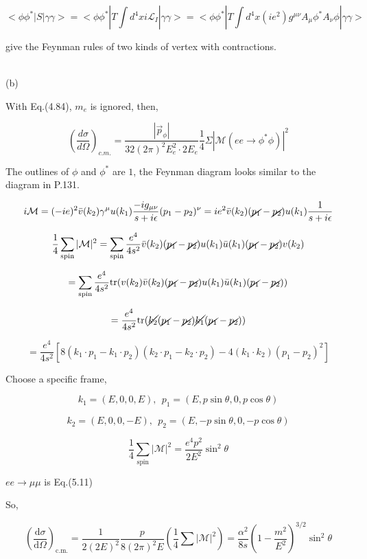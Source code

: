 \documentclass[prd,aps,nofootinbib,floatfix,10pt]{revtex4}
\newcommand{\blue}[1]{{\color{blue} #1}}
\begin{document}
\[ <\phi \phi^* | S | \gamma \gamma> = <\phi \phi^* | T \int d^4 x i \mathcal{L}_I | \gamma \gamma> = <\phi \phi^* | T \int d^4 x (i e^2) g^{\mu \nu} A_{\mu} \phi^* A_{\nu} \phi | \gamma \gamma> \]

give the Feynman rules of two kinds of vertex with contractions.


~\\
\noindent (b)

With \blue{Eq.(4.84)}, $m_e$ is ignored, then,

\[(\frac{d \sigma}{d \Omega})_{c.m.} = \frac{|\vec{p}_{\phi}|}{32 (2\pi)^2 E_{e}^2 \cdot 2 E_e } \frac{1}{4} \Sigma |\mathcal{M}(ee \to \phi^*\phi)|^2\]

The outlines of $\phi$ and $\phi^*$ are $1$, the Feynman diagram looks similar to the diagram in \blue{P.131}.

\[ i \mathcal{M} = (-i e)^2 \bar{v}(k_2) \gamma^{\mu} u(k_1) \frac{-i g_{\mu \nu}}{s + i \epsilon} (p_1 - p_2)^{\nu} = i e^2 \bar{v}(k_2) (\cancel{p_1} - \cancel{p_2}) u(k_1) \frac{1}{s + i \epsilon}\]

\[\frac{1}{4} \sum_{\text{spin}} |\mathcal{M}|^2 = \sum_{\text{spin}} \frac{e^4}{4 s^2} \bar{v}(k_2) (\cancel{p_1} - \cancel{p_2}) u(k_1) \bar{u}(k_1) (\cancel{p_1} - \cancel{p_2}) v(k_2) \]

\[ = \sum_{\text{spin}} \frac{e^4}{4 s^2} \text{tr}( v(k_2) \bar{v}(k_2) (\cancel{p_1} - \cancel{p_2}) u(k_1) \bar{u}(k_1) (\cancel{p_1} - \cancel{p_2}) ) \]

\[ = \frac{e^4}{4 s^2} \text{tr}( \cancel{k_2} (\cancel{p_1} - \cancel{p_2}) \cancel{k_1} (\cancel{p_1} - \cancel{p_2}) ) \]

\[ = \frac{e^{4}}{4 s^{2}}\left[8\left(k_{1} \cdot p_{1}-k_{1} \cdot p_{2}\right)\left(k_{2} \cdot p_{1}-k_{2} \cdot p_{2}\right)-4\left(k_{1} \cdot k_{2}\right)\left(p_{1}-p_{2}\right)^{2}\right] \]

Choose a specific frame, 

\[ k_{1}=(E, 0,0, E), \ \  p_{1}=(E, p \sin \theta, 0, p \cos \theta) \]

\[k_{2}=(E, 0,0,-E), \ \  p_{2}=(E,-p \sin \theta, 0,-p \cos \theta)\]

\[ \frac{1}{4} \sum_{\text{spin}} |\mathcal{M}|^2 = \frac{e^{4} p^{2}}{2 E^{2}} \sin ^{2} \theta \]

$ee \to \mu \mu$ is \blue{Eq.(5.11)}

So,

\[
    \left(\frac{\mathrm{d} \sigma}{\mathrm{d} \Omega}\right)_{\mathrm{c.m.}}=\frac{1}{2(2 E)^{2}} \frac{p}{8(2 \pi)^{2} E}\left(\frac{1}{4} \sum|\mathcal{M}|^{2}\right)=\frac{\alpha^{2}}{8 s}\left(1-\frac{m^{2}}{E^{2}}\right)^{3 / 2} \sin ^{2} \theta 
\]
\end{document}
